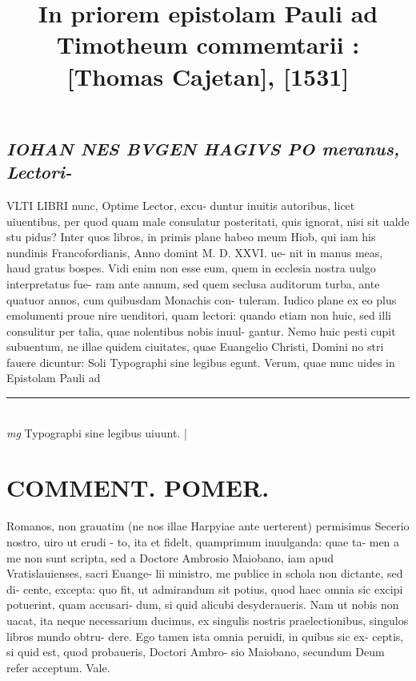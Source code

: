 \documentclass{article}
\begin{document}
\date{}
        \title{In priorem epistolam Pauli ad Timotheum commemtarii : [Thomas Cajetan], [1531]}
\maketitle
\tableofcontents
\clearpage
\begin{pages} 
\beginnumbering
        
{}
\subsection*{\textit{IOHAN NES BVGEN HAGIVS PO meranus, Lectori- }}\pstart VLTI LIBRI nunc, Optime Lector, excu- duntur inuitis autoribus, licet uiuentibus, per quod quam male consulatur posteritati, quis ignorat, nisi sit ualde stu pidus? Inter quos libros, in primis plane habeo meum Hiob, qui iam his nundinis Francofordianis, Anno domint M. D. XXVI. ue- nit in manus meas, haud gratus bospes. Vidi enim non esse eum, quem in ecclesia nostra uulgo interpretatus fue- ram ante annum, sed quem seclusa auditorum turba, ante quatuor annos, cum quibusdam Monachis con- tuleram. Iudico plane ex eo plus emolumenti proue nire uenditori, quam lectori: quando etiam non huic, sed illi consulitur per talia, quae nolentibus nobis inuul- gantur. Nemo huic pesti cupit subuentum, ne illae quidem ciuitates, quae Euangelio Christi, Domini no stri fauere dicuntur: Soli Typographi sine legibus egunt. Verum, quae nunc uides in Epistolam Pauli ad  \pend
\vspace{0.5cm}\noindent
\vspace{0.2cm}\rule{1cm}{0.2pt}\\ 
\hspace{0.2cm}\textit{mg}
\footnotesize Typograpbi sine legibus uiuunt. 
\normalsize| 
\section*{COMMENT. POMER.  }\pstart Romanos, non grauatim (ne nos illae Harpyiae ante uerterent) permisimus Secerio nostro, uiro ut erudi - to, ita et fidelt, quamprimum inuulganda: quae ta- men a me non sunt scripta, sed a Doctore Ambrosio Maiobano, iam apud Vratislauienses, sacri Euange- lii ministro, me publice in schola non dictante, sed di- cente, excepta: quo fit, ut admirandum sit potius, quod haec omnia sic excipi potuerint, quam accusari- dum, si quid alicubi desyderaueris. Nam ut nobis non uacat, ita neque necessarium ducimus, ex singulis nostris praelectionibus, singulos libros mundo obtru- dere. Ego tamen ista omnia peruidi, in quibus sic ex- ceptis, si quid est, quod probaueris, Doctori Ambro- sio Maiobano, secundum Deum refer acceptum.  Vale.   \pend
{}
{}

\end{pages}
\end{document}
